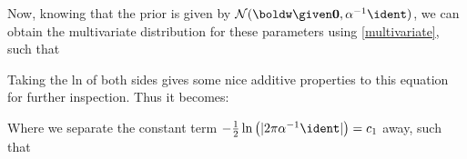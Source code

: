 \documentclass[submit]{harvardml}
\begin{document}


\noindent Now, knowing that the prior is given by $\mathcal{N}(\boldw \given \bold0, \alpha^{-1}\ident )$, we can obtain the multivariate distribution for these parameters using \cref{multivariate}, such that 

Taking the ln of both sides gives some nice additive properties to this equation for further inspection. Thus it becomes:


\noindent Where we separate the constant term $-{1\over2}\ln\left(|2\pi\alpha^{-1}\ident|\right)=c_1$ away, such that

\end{document}
